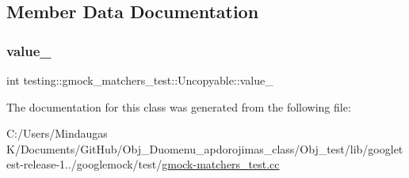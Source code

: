\subsection{Member Data Documentation}
\mbox{\label{classtesting_1_1gmock__matchers__test_1_1_uncopyable_a553a826c5f4aea0a52da8b2769d24faa}} 
\subsubsection{\texorpdfstring{value\_}{value\_}}
{\footnotesize\ttfamily int testing\+::gmock\+\_\+matchers\+\_\+test\+::\+Uncopyable\+::value\+\_\+\hspace{0.3cm}{\ttfamily [private]}}



The documentation for this class was generated from the following file\+:\begin{DoxyCompactItemize}
\item 
C\+:/\+Users/\+Mindaugas K/\+Documents/\+Git\+Hub/\+Obj\+\_\+\+Duomenu\+\_\+apdorojimas\+\_\+class/\+Obj\+\_\+test/lib/googletest-\/release-\/1../googlemock/test/\mbox{\hyperlink{_obj__test_2lib_2googletest-release-1_88_81_2googlemock_2test_2gmock-matchers__test_8cc}{gmock-\/matchers\+\_\+test.\+cc}}\end{DoxyCompactItemize}
